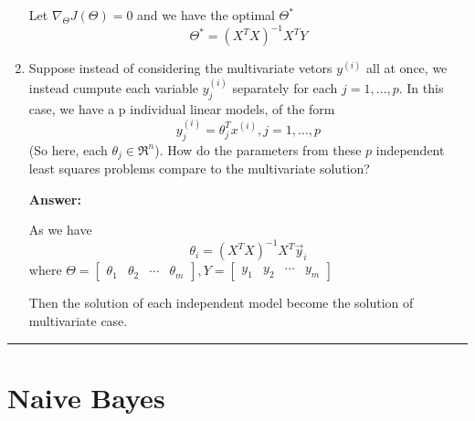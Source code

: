 \documentclass[a4paper,14pt]{article}
\begin{document}
\begin{enumerate}[label=(\alph*)]
Let $\nabla_{\Theta} J(\Theta) = 0$ and we have the optimal $\Theta^{*}$
\begin{equation}
    \Theta^{*} = (X^{T}X)^{-1}X^{T}Y
\end{equation}

    \item Suppose instead of considering the multivariate vetors $y^{(i)}$ all at once, we instead cumpute each variable
    $y_{j}^{(i)}$ separately for each $j=1,\dots,p$. In this case, we have a p individual linear models, of the form \begin{equation*}
        y_{j}^{(i)} = \theta_{j}^{T}x^{(i)}, j=1,\dots,p
    \end{equation*} (So here, each $\theta_{j} \in \Re^{n}$). How do the parameters from these $p$ independent least
    squares problems compare to the multivariate solution?

\textbf{Answer:}

As we have
\begin{equation}
    \theta_{i} = (X^{T}X)^{-1}X^{T}\vec{y}_{i}
\end{equation}
where $\Theta = \begin{bmatrix} 
    \theta_{1} & \theta_{2} & \cdots & \theta_{m}
\end{bmatrix}, Y = \begin{bmatrix}
    y_{1} & y_{2} & \cdots & y_{m}
\end{bmatrix}$

Then the solution of each independent model become the solution of multivariate case.
\end{enumerate}

\noindent\rule{\textwidth}{0.5pt}

\section{Naive Bayes}
\end{document}
